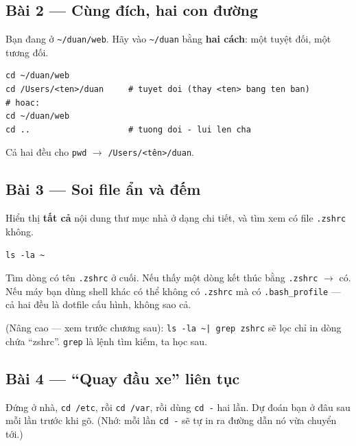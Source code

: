 \documentclass[12pt,a4paper]{article}
\newcommand{\hm}{\textasciitilde{}}
\begin{document}
\subsection{Bài 2 --- Cùng đích, hai con đường}
Bạn đang ở \texttt{\hm/duan/web}. Hãy vào \texttt{\hm/duan} bằng \textbf{hai cách}: một tuyệt đối, một tương đối.

\begin{notebox}[title={Đáp án}]
\begin{codebox}
\begin{verbatim}
cd ~/duan/web
cd /Users/<ten>/duan     # tuyet doi (thay <ten> bang ten ban)
# hoac:
cd ~/duan/web
cd ..                    # tuong doi - lui len cha
\end{verbatim}
\end{codebox}
Cả hai đều cho \texttt{pwd} $\rightarrow$ \texttt{/Users/<tên>/duan}.
\end{notebox}

\subsection{Bài 3 --- Soi file ẩn và đếm}
Hiển thị \textbf{tất cả} nội dung thư mục nhà ở dạng chi tiết, và tìm xem có file \texttt{.zshrc} không.

\begin{notebox}[title={Đáp án / kết quả mong đợi}]
\begin{codebox}
\begin{verbatim}
ls -la ~
\end{verbatim}
\end{codebox}
Tìm dòng có tên \texttt{.zshrc} ở cuối. Nếu thấy một dòng kết thúc bằng \texttt{.zshrc} $\rightarrow$ có. Nếu máy bạn dùng shell khác có thể không có \texttt{.zshrc} mà có \texttt{.bash\_profile} --- cả hai đều là dotfile cấu hình, không sao cả.

\vspace{0.4em}
(Nâng cao --- xem trước chương sau): \texttt{ls -la \hm | grep zshrc} sẽ lọc chỉ in dòng chứa ``zshrc''. \texttt{grep} là lệnh tìm kiếm, ta học sau.
\end{notebox}

\subsection{Bài 4 --- ``Quay đầu xe'' liên tục}
Đứng ở nhà, \texttt{cd /etc}, rồi \texttt{cd /var}, rồi dùng \texttt{cd -} hai lần. Dự đoán bạn ở đâu sau mỗi lần trước khi gõ. (Nhớ: mỗi lần \texttt{cd -} sẽ tự in ra đường dẫn nó vừa chuyển tới.)
\end{document}
